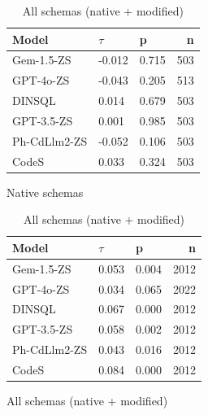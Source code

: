 \begin{table}
  \centering
  \caption{Kendall-Tau ($\tau$) Correlations between \emph{Low Identifier Proportion} and \emph{Query Precision}.}
  \begin{subfigure}{.5\linewidth}
      \centering
      \caption{Native schemas}
      \begin{tabular}{lllr}
\toprule
Model & $\tau$ & p & n \\
\midrule
Gem-1.5-ZS & -0.012 & 0.715 & 503 \\
GPT-4o-ZS & -0.043 & 0.205 & 513 \\
DINSQL & 0.014 & 0.679 & 503 \\
GPT-3.5-ZS & 0.001 & 0.985 & 503 \\
Ph-CdLlm2-ZS & -0.052 & 0.106 & 503 \\
CodeS & 0.033 & 0.324 & 503 \\
\bottomrule
\end{tabular}

      \label{table:natmedium-precision-ktau-native}
  \end{subfigure}%
  \begin{subfigure}{.5\linewidth}
      \centering
      \caption{All schemas (native + modified)}
      \begin{tabular}{lllr}
\toprule
Model & $\tau$ & p & n \\
\midrule
Gem-1.5-ZS & 0.053 & 0.004 & 2012 \\
GPT-4o-ZS & 0.034 & 0.065 & 2022 \\
DINSQL & 0.067 & 0.000 & 2012 \\
GPT-3.5-ZS & 0.058 & 0.002 & 2012 \\
Ph-CdLlm2-ZS & 0.043 & 0.016 & 2012 \\
CodeS & 0.084 & 0.000 & 2012 \\
\bottomrule
\end{tabular}

      \label{table:natmedium-precision-ktau-all}
  \end{subfigure}
\end{table}

